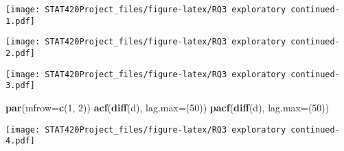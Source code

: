 \documentclass[]{article}
\newenvironment{Shaded}{\begin{snugshade}}{\end{snugshade}}
\newcommand{\CommentTok}[1]{\textcolor[rgb]{0.56,0.35,0.01}{\textit{#1}}}
\newcommand{\DataTypeTok}[1]{\textcolor[rgb]{0.13,0.29,0.53}{#1}}
\newcommand{\DecValTok}[1]{\textcolor[rgb]{0.00,0.00,0.81}{#1}}
\newcommand{\KeywordTok}[1]{\textcolor[rgb]{0.13,0.29,0.53}{\textbf{#1}}}
\newcommand{\NormalTok}[1]{#1}
\newcommand{\OperatorTok}[1]{\textcolor[rgb]{0.81,0.36,0.00}{\textbf{#1}}}
\newcommand{\StringTok}[1]{\textcolor[rgb]{0.31,0.60,0.02}{#1}}
\begin{document}
\begin{Shaded}
\end{Shaded}

\texttt{[image: STAT420Project\_files/figure-latex/RQ3 exploratory continued-1.pdf]}

\begin{Shaded}
\end{Shaded}

\texttt{[image: STAT420Project\_files/figure-latex/RQ3 exploratory continued-2.pdf]}

\begin{Shaded}
\end{Shaded}

\texttt{[image: STAT420Project\_files/figure-latex/RQ3 exploratory continued-3.pdf]}

\begin{Shaded}
\begin{Highlighting}[]
\KeywordTok{par}\NormalTok{(}\DataTypeTok{mfrow=}\KeywordTok{c}\NormalTok{(}\DecValTok{1}\NormalTok{, }\DecValTok{2}\NormalTok{))}
\KeywordTok{acf}\NormalTok{(}\KeywordTok{diff}\NormalTok{(d), }\DataTypeTok{lag.max=}\NormalTok{(}\DecValTok{50}\NormalTok{))}
\KeywordTok{pacf}\NormalTok{(}\KeywordTok{diff}\NormalTok{(d),  }\DataTypeTok{lag.max=}\NormalTok{(}\DecValTok{50}\NormalTok{))}
\end{Highlighting}
\end{Shaded}

\texttt{[image: STAT420Project\_files/figure-latex/RQ3 exploratory continued-4.pdf]}

\begin{Shaded}
\end{Shaded}
\end{document}
